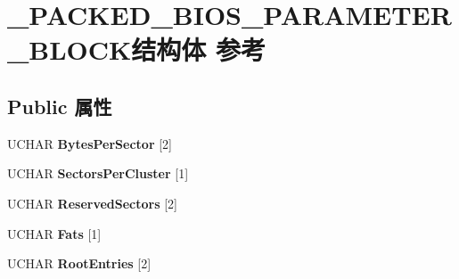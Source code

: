 \hypertarget{struct___p_a_c_k_e_d___b_i_o_s___p_a_r_a_m_e_t_e_r___b_l_o_c_k}{}\section{\+\_\+\+P\+A\+C\+K\+E\+D\+\_\+\+B\+I\+O\+S\+\_\+\+P\+A\+R\+A\+M\+E\+T\+E\+R\+\_\+\+B\+L\+O\+C\+K结构体 参考}
\label{struct___p_a_c_k_e_d___b_i_o_s___p_a_r_a_m_e_t_e_r___b_l_o_c_k}
\subsection*{Public 属性}
\begin{DoxyCompactItemize}
\item 
\mbox{\label{struct___p_a_c_k_e_d___b_i_o_s___p_a_r_a_m_e_t_e_r___b_l_o_c_k_a3e3c52559b457b5b093297f784a0552c}} 
U\+C\+H\+AR {\bfseries Bytes\+Per\+Sector} \mbox{[}2\mbox{]}
\item 
\mbox{\label{struct___p_a_c_k_e_d___b_i_o_s___p_a_r_a_m_e_t_e_r___b_l_o_c_k_aa53293da9e56e05dccff549caaa5574f}} 
U\+C\+H\+AR {\bfseries Sectors\+Per\+Cluster} \mbox{[}1\mbox{]}
\item 
\mbox{\label{struct___p_a_c_k_e_d___b_i_o_s___p_a_r_a_m_e_t_e_r___b_l_o_c_k_a52ae9b2d9084642d8df8cf5056aa087d}} 
U\+C\+H\+AR {\bfseries Reserved\+Sectors} \mbox{[}2\mbox{]}
\item 
\mbox{\label{struct___p_a_c_k_e_d___b_i_o_s___p_a_r_a_m_e_t_e_r___b_l_o_c_k_af2c72f3e711e20b3408ab3ea650e0ab8}} 
U\+C\+H\+AR {\bfseries Fats} \mbox{[}1\mbox{]}
\item 
\mbox{\label{struct___p_a_c_k_e_d___b_i_o_s___p_a_r_a_m_e_t_e_r___b_l_o_c_k_a04621cd2a31ce22646955e0ef309b7c9}} 
U\+C\+H\+AR {\bfseries Root\+Entries} \mbox{[}2\mbox{]}
\item 
\mbox{\label{struct___p_a_c_k_e_d___b_i_o_s___p_a_r_a_m_e_t_e_r___b_l_o_c_k_a1a0481e62aa571d4acfdb7ff13559f06}} 

\end{DoxyCompactItemize}
